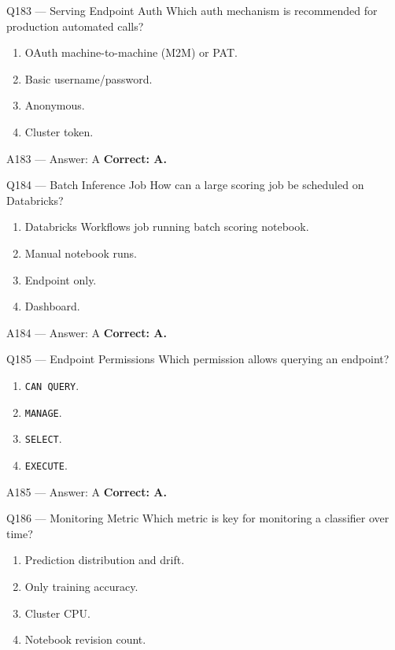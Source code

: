 \documentclass[aspectratio=169,9pt]{beamer}
\begin{document}
	\begin{frame}{Q183 --- Serving Endpoint Auth}
		Which auth mechanism is recommended for production automated calls?
		\begin{enumerate}[label=\Alph*.]
			\item OAuth machine-to-machine (M2M) or PAT.
			\item Basic username/password.
			\item Anonymous.
			\item Cluster token.
		\end{enumerate}
	\end{frame}
	
	\begin{frame}{A183 --- Answer: A}
		\textbf{Correct: A.}
	\end{frame}
	
	\begin{frame}{Q184 --- Batch Inference Job}
		How can a large scoring job be scheduled on Databricks?
		\begin{enumerate}[label=\Alph*.]
			\item Databricks Workflows job running batch scoring notebook.
			\item Manual notebook runs.
			\item Endpoint only.
			\item Dashboard.
		\end{enumerate}
	\end{frame}
	
	\begin{frame}{A184 --- Answer: A}
		\textbf{Correct: A.}
	\end{frame}
	
	\begin{frame}{Q185 --- Endpoint Permissions}
		Which permission allows querying an endpoint?
		\begin{enumerate}[label=\Alph*.]
			\item \texttt{CAN QUERY}.
			\item \texttt{MANAGE}.
			\item \texttt{SELECT}.
			\item \texttt{EXECUTE}.
		\end{enumerate}
	\end{frame}
	
	\begin{frame}{A185 --- Answer: A}
		\textbf{Correct: A.}
	\end{frame}
	
	\begin{frame}{Q186 --- Monitoring Metric}
		Which metric is key for monitoring a classifier over time?
		\begin{enumerate}[label=\Alph*.]
			\item Prediction distribution and drift.
			\item Only training accuracy.
			\item Cluster CPU.
			\item Notebook revision count.
		\end{enumerate}
	\end{frame}
	
\end{document}
